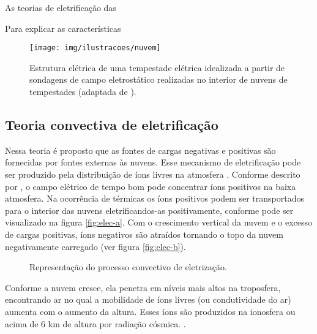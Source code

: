 As teorias de eletrificação das


Para explicar as características





\begin{figure}[htp]
\centering 
\texttt{[image: img/ilustracoes/nuvem]}
\caption{Estrutura elétrica de uma tempestade elétrica idealizada a partir de sondagens de campo eletrostático realizadas no interior de nuvens de tempestades (adaptada de ).}
\label{fig:multipcentros}
\end{figure}

\subsection{Teoria convectiva de eletrificação}

Nessa teoria é proposto que as fontes de cargas negativas e positivas são fornecidas por fontes externas às nuvens. Esse mecanismo de eletrificação pode ser produzido pela distribuição de íons livres na atmosfera \cite{wilson1956,phillips1967}  \cite[apud \cite{vonnegut1995}]{grenet,wagner1981}. Conforme descrito por , o campo elétrico de tempo bom pode concentrar íons positivos na baixa atmosfera. Na ocorrência de térmicas os íons positivos podem ser transportados para o interior das nuvens eletrificandos-as positivamente, conforme pode ser visualizado na figura \ref{fig:elec-a}. Com o crescimento vertical da nuvem e o excesso de cargas positivas,  íons  negativos são atraídos tornando o topo da nuvem negativamente carregado (ver figura \ref{fig:elec-b}).

\begin{figure}[htp]
   \centering
   \caption{Representação do processo convectivo de eletrização.}
   \label{fig:elec}
\end{figure}

\begin{citacao}
Conforme a nuvem cresce, ela penetra em níveis mais altos na troposfera, encontrando ar no qual a mobilidade de íons livres (ou condutividade do ar) aumenta com o aumento da altura. Esses íons são produzidos na ionosfera ou acima de 6 km de altura por radiação cósmica. \cite[p.~10]{rachel}.
\end{citacao}

